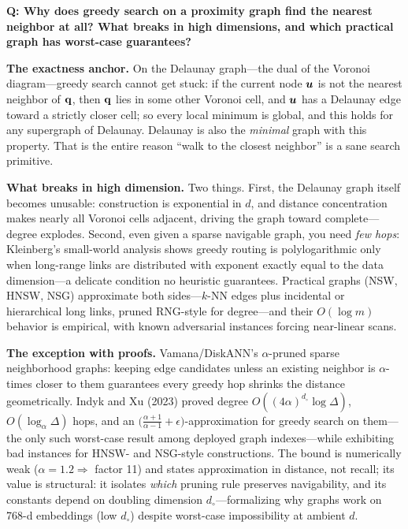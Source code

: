 \begin{interviewq}
\textbf{Q: Why does greedy search on a proximity graph find the nearest neighbor at all? What breaks in high dimensions, and which practical graph has worst-case guarantees?}

 \quad {} \quad \badgefreq{\freqlow}

\stronganswer

\textbf{The exactness anchor.} On the Delaunay graph---the dual of the Voronoi diagram---greedy search cannot get stuck: if the current node $\bm{u}$ is not the nearest neighbor of $\mathbf{q}$, then $\mathbf{q}$ lies in some other Voronoi cell, and $\bm{u}$ has a Delaunay edge toward a strictly closer cell; so every local minimum is global, and this holds for any supergraph of Delaunay. Delaunay is also the \emph{minimal} graph with this property. That is the entire reason ``walk to the closest neighbor'' is a sane search primitive.

\textbf{What breaks in high dimension.} Two things. First, the Delaunay graph itself becomes unusable: construction is exponential in $d$, and distance concentration makes nearly all Voronoi cells adjacent, driving the graph toward complete---degree explodes. Second, even given a sparse navigable graph, you need \emph{few hops}: Kleinberg's small-world analysis shows greedy routing is polylogarithmic only when long-range links are distributed with exponent exactly equal to the data dimension---a delicate condition no heuristic guarantees. Practical graphs (NSW, HNSW, NSG) approximate both sides---$k$-NN edges plus incidental or hierarchical long links, pruned RNG-style for degree---and their $O(\log m)$ behavior is empirical, with known adversarial instances forcing near-linear scans.

\textbf{The exception with proofs.} Vamana/DiskANN's $\alpha$-pruned sparse neighborhood graphs: keeping edge candidates unless an existing neighbor is $\alpha$-times closer to them guarantees every greedy hop shrinks the distance geometrically. Indyk and Xu (2023) proved degree $O((4\alpha)^{d_\circ}\log\Delta)$, $O(\log_{\alpha}\Delta)$ hops, and an $\big(\frac{\alpha+1}{\alpha-1}+\epsilon\big)$-approximation for greedy search on them---the only such worst-case result among deployed graph indexes---while exhibiting bad instances for HNSW- and NSG-style constructions. The bound is numerically weak ($\alpha = 1.2 \Rightarrow$ factor 11) and states approximation in distance, not recall; its value is structural: it isolates \emph{which} pruning rule preserves navigability, and its constants depend on doubling dimension $d_\circ$---formalizing why graphs work on 768-d embeddings (low $d_\circ$) despite worst-case impossibility at ambient $d$.


\end{interviewq}

